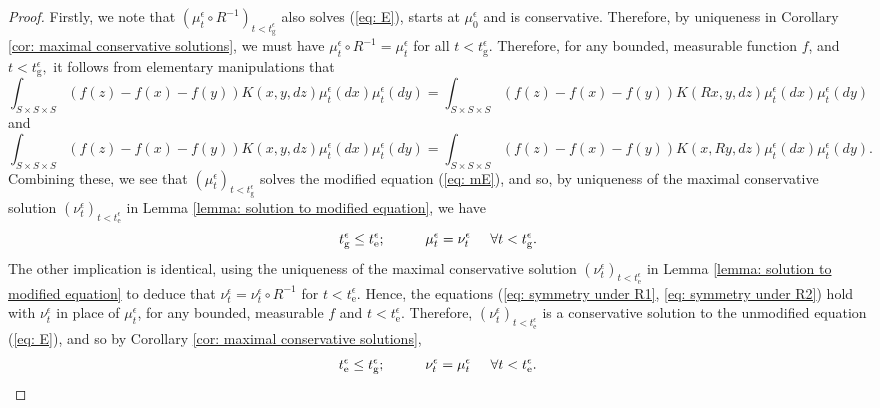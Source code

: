\begin{proof} Firstly, we note that $( \mu^\epsilon_t \circ R^{-1})_{t<t_\mathrm{g}^\epsilon}$ also solves (\ref{eq: E}), starts at $\mu^\epsilon_0$ and is conservative. Therefore, by uniqueness in Corollary \ref{cor: maximal conservative solutions}, we must have $\mu^\epsilon_t \circ R^{-1}=\mu^\epsilon_t$ for all $t<t_\mathrm{g}^\epsilon.$ Therefore, for any bounded, measurable function $f$, and $t<t^\epsilon_\mathrm{g},$ it follows from elementary manipulations that \begin{equation}\label{eq: symmetry under R1}
        \int_{S\times S\times S} (f(z)-f(x)-f(y))K(x,y,dz)\mu^\epsilon_t(dx)\mu^\epsilon_t(dy) =  \int_{S\times S\times S} (f(z)-f(x)-f(y))K(Rx,y,dz)\mu^\epsilon_t(dx)\mu^\epsilon_t(dy)
    \end{equation} and
\begin{equation}\label{eq: symmetry under R2}
        \int_{S\times S\times S} (f(z)-f(x)-f(y))K(x,y,dz)\mu^\epsilon_t(dx)\mu^\epsilon_t(dy) =  \int_{S\times S\times S} (f(z)-f(x)-f(y))K(x,Ry,dz)\mu^\epsilon_t(dx)\mu^\epsilon_t(dy).
    \end{equation} Combining these, we see that $(\mu^\epsilon_t)_{t<t^\epsilon_\mathrm{g}}$ solves the modified equation (\ref{eq: mE}), and so, by uniqueness of the maximal conservative solution $(\nu^\epsilon_t)_{t<t_\mathrm{e}^\epsilon}$ in Lemma \ref{lemma: solution to modified equation}, we have \begin{equation}
        t^\epsilon_\mathrm{g} \leq t_\mathrm{e}^\epsilon; \hspace{1cm} \mu^\epsilon_t=\nu^\epsilon_t \hspace{0.5cm}\forall t<t^\epsilon_\mathrm{g}.
    \end{equation} The other implication is identical, using the uniqueness of the maximal conservative solution $(\nu^\epsilon_t)_{t<t_\mathrm{e}^\epsilon}$ in Lemma \ref{lemma: solution to modified equation} to deduce that $\nu^\epsilon_t= \nu^\epsilon_t\circ R^{-1}$ for $t<t_\mathrm{e}^\epsilon$. Hence, the equations (\ref{eq: symmetry under R1}, \ref{eq: symmetry under R2}) hold with $\nu^\epsilon_t$ in place of $\mu^\epsilon_t$, for any bounded, measurable $f$ and $t<t_\mathrm{e}^\epsilon.$ Therefore, $(\nu^\epsilon_t)_{t<t_\mathrm{e}^\epsilon}$ is a conservative solution to the unmodified equation (\ref{eq: E}), and so by Corollary \ref{cor: maximal conservative solutions}, \begin{equation}
        t_\mathrm{e}^\epsilon \leq t^\epsilon_\mathrm{g}; \hspace{1cm} \nu^\epsilon_t=\mu^\epsilon_t \hspace{0.5cm}\forall t<t_\mathrm{e}^\epsilon.
    \end{equation} \end{proof}  

